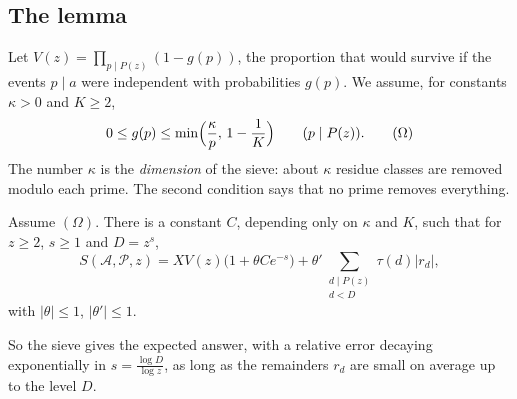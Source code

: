 \subsection*{The lemma}

Let $V(z)=\prod_{p\mid P(z)}(1-g(p))$, the proportion that would survive if the events $p\mid a$ were independent with probabilities $g(p)$. We assume, for constants $\kappa>0$ and $K\ge2$,
\[
0\le g(p)\le\min\Bigl(\frac\kappa p,\,1-\frac1K\Bigr)\qquad(p\mid P(z)).\tag{$\Omega$}
\]
The number $\kappa$ is the \emph{dimension} of the sieve: about $\kappa$ residue classes are removed modulo each prime. The second condition says that no prime removes everything.

\begin{theorem}\label{thm:fl}
Assume $(\Omega)$. There is a constant $C$, depending only on $\kappa$ and $K$, such that for $z\ge2$, $s\ge1$ and $D=z^s$,
\[
S(\mathcal A,\mathcal P,z)=XV(z)\bigl(1+\theta Ce^{-s}\bigr)+\theta'\sum_{\substack{d\mid P(z)\\d<D}}\tau(d)|r_d|,
\]
with $|\theta|\le1$, $|\theta'|\le1$.
\end{theorem}

So the sieve gives the expected answer, with a relative error decaying exponentially in $s=\frac{\log D}{\log z}$, as long as the remainders $r_d$ are small on average up to the level $D$.

